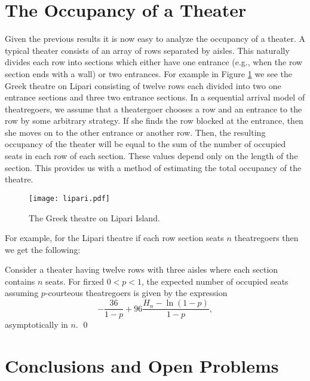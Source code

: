 \documentclass[11pt]{llncs}
\begin{document}
\section{The Occupancy of a Theater}
\label{theater:sec}

Given the previous results it is now easy to analyze the occupancy of a theater.
A typical theater consists of an array of rows separated by aisles.
This
naturally divides each row into sections which either have one entrance (e.g.,
when the row section ends with a wall) or two entrances. 
For example
in Figure \ref{lipari-fig} we see the Greek theatre on Lipari consisting of twelve
rows each divided into two one entrance sections and three two entrance sections.
In a sequential arrival model of
theatregoers, we assume that a theatergoer chooses a row and an entrance to the row by some arbitrary strategy. If she finds the row blocked at the entrance, then she moves on to the other entrance or another row. Then, the resulting occupancy of the theater will be equal to the sum of the number of occupied seats in each row of each
section. 
These values depend only on the length of the section. This
provides us with a method of estimating the total occupancy of the theatre. 



\begin{figure}[!h]
\begin{center}
\texttt{[image: lipari.pdf]}\end{center}
\caption{The Greek theatre on Lipari Island.}
\label{lipari-fig}
\end{figure}

For example, for the Lipari theatre if each row section seats $n$ theatregoers then
we get the following:
\begin{corollary}
Consider a
theater having twelve rows with three aisles where each 
section contains $n$ seats. For firxed $0 <p<1$, the
expected number of occupied seats
assuming $p$-courteous
theatregoers is given by the expression
\begin{equation}
\label{pach3a}
-\frac{36}{1-p} + 96\frac{H_n - \ln (1-p)}{1-p},
\end{equation}
asymptotically in $n$.
\qed
\end{corollary}

\section{Conclusions and Open Problems}
\label{other:sec}
\end{document}
